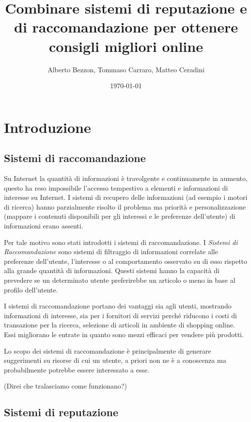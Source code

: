 \documentclass{report}
\author{Alberto Bezzon, Tommaso Carraro, Matteo Ceradini} \title{Combinare sistemi di reputazione e di raccomandazione per ottenere consigli migliori online} \date{\today}
\begin{document}
	\maketitle
	\tableofcontents
	\newpage
	\hypertarget{header-n0}{%
		\section{Introduzione}\label{header-n0}}
	
	\hypertarget{header-n2}{%
		\subsection{Sistemi di raccomandazione}\label{header-n2}}
	
	Su Internet la quantità di informazioni è travolgente e continuamente in
	aumento, questo ha reso impossibile l'accesso tempestivo a elementi e
	informazioni di interesse su Internet. I sistemi di recupero delle
	informazioni (ad esempio i motori di ricerca) hanno parzialmente risolto
	il problema ma priorità e personalizzazione (mappare i contenuti
	disponibili per gli interessi e le preferenze dell'utente) di
	informazioni erano assenti.
	
	Per tale motivo sono stati introdotti i sistemi di raccomandazione. I
	\emph{Sistemi di Raccomandazione} sono sistemi di filtraggio di
	informazioni correlate alle preferenze dell'utente, l'interesse o al
	comportamento osservato su di esso rispetto alla grande quantità di
	informazioni. Questi sistemi hanno la capacità di prevedere se un
	determinato utente preferirebbe un articolo o meno in base al profilo
	dell'utente.
	
	I sistemi di raccomandazione portano dei vantaggi sia agli utenti,
	mostrando informazioni di interesse, sia per i fornitori di servizi
	perché riducono i costi di transazione per la ricerca, selezione di
	articoli in ambiente di shopping online. Essi migliorano le entrate in
	quanto sono mezzi efficaci per vendere più prodotti.
	
	Lo scopo dei sistemi di raccomandazione è principalmente di generare
	suggerimenti su risorse di cui un utente, a priori non ne è a conoscenza
	ma probabilmente potrebbe essere interessato a esse.
	
	(Direi che tralasciamo come funzionano?)
	
	\hypertarget{header-n15}{%
		\subsection{Sistemi di reputazione}\label{header-n15}}
	
\end{document}
